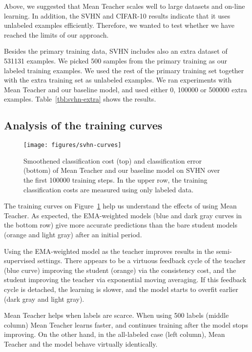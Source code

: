 \documentclass{article}
\begin{document}
Above, we suggested that Mean Teacher scales well to large datasets and on-line learning.
In addition, the SVHN and CIFAR-10 results indicate that it uses unlabeled examples efficiently.
Therefore, we wanted to test whether we have reached the limits of our approach.

Besides the primary training data, SVHN includes also an extra dataset of 531131 examples.
We picked 500 samples from the primary training as our labeled training examples.
We used the rest of the primary training set together with the extra training set as unlabeled examples.
We ran experiments with Mean Teacher and our baseline  model, and used either 0, 100000 or 500000 extra examples.
Table~\ref{tbl:svhn-extra} shows the results.

\subsection{Analysis of the training curves}

\begin{figure}[t]
\vskip 0.2in
\begin{center}
\centerline{\texttt{[image: figures/svhn-curves]}}
\caption{Smoothened classification cost (top) and classification error (bottom) of Mean Teacher and our baseline  model on SVHN over the first 100000 training steps.
In the upper row, the training classification costs are measured using only labeled data.}
\label{fig:svhn_curves}
\end{center}
\vskip -0.2in
\end{figure}

The training curves on Figure~\ref{fig:svhn_curves} help us understand the effects of using Mean Teacher. As expected, the EMA-weighted models (blue and dark gray curves in the bottom row) give more accurate predictions than the bare student models (orange and light gray) after an initial period.

Using the EMA-weighted model as the teacher improves results in the semi-supervised settings.
There appears to be a virtuous feedback cycle of the teacher (blue curve) improving the student (orange) via the consistency cost, and the student improving the teacher via exponential moving averaging.
If this feedback cycle is detached, the learning is slower, and the model starts to overfit earlier (dark gray and light gray).

Mean Teacher helps when labels are scarce.
When using 500 labels (middle column) Mean Teacher learns faster, and continues training after the  model stops improving.
On the other hand, in the all-labeled case (left column), Mean Teacher and the  model behave virtually identically.
\end{document}
